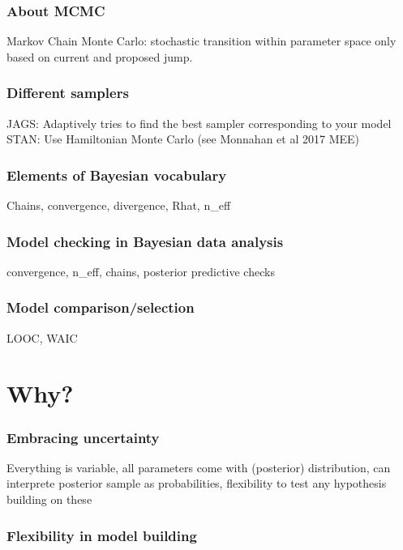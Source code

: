 \documentclass{beamer}
\begin{document}
\begin{frame}
 \begin{frame}
  \frametitle{\bf About MCMC}
  
  Markov Chain Monte Carlo: stochastic transition within parameter space only based on current and proposed jump.
  
 \end{frame}


  \begin{frame}
  \frametitle{\bf Different samplers}
  
  JAGS: Adaptively tries to find the best sampler corresponding to your model
  STAN: Use Hamiltonian Monte Carlo (see Monnahan et al 2017 MEE)
  
 \end{frame}
 
   
  \begin{frame}
  \frametitle{\bf Elements of Bayesian vocabulary}
  
  Chains, convergence, divergence, Rhat, n\_eff
  
 \end{frame}
 
  \begin{frame}
  \frametitle{\bf Model checking in Bayesian data analysis}
  
  convergence, n\_eff, chains, posterior predictive checks
  
 \end{frame}
 
  \begin{frame}
  \frametitle{\bf Model comparison/selection}
  
  LOOC, WAIC
  
 \end{frame}
 

\section{Why?}
 
  \begin{frame}
  \frametitle{\bf Embracing uncertainty}
  
  Everything is variable, all parameters come with (posterior) distribution, can interprete posterior sample
  as probabilities, flexibility to test any hypothesis building on these
  
 \end{frame}
 
  \begin{frame}
  \frametitle{\bf Flexibility in model building}
  

\end{frame}
\end{frame}
\end{document}
